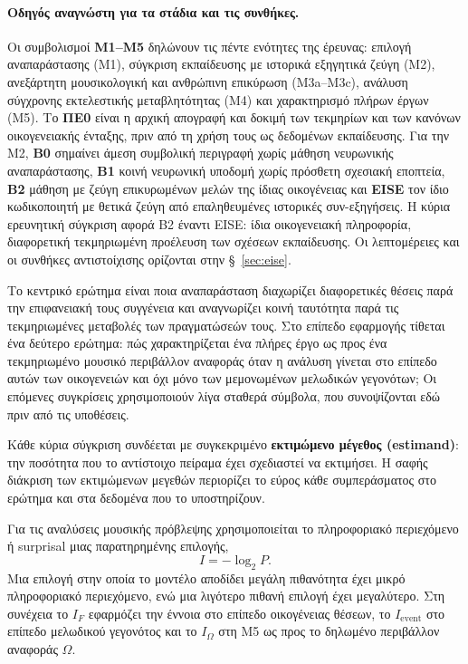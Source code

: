 \documentclass[11pt,a4paper]{article}
\begin{document}
\paragraph{Οδηγός αναγνώστη για τα στάδια και τις συνθήκες.}
Οι συμβολισμοί \textbf{M1--M5} δηλώνουν τις πέντε ενότητες της έρευνας: επιλογή αναπαράστασης (M1), σύγκριση εκπαίδευσης με ιστορικά εξηγητικά ζεύγη (M2), ανεξάρτητη μουσικολογική και ανθρώπινη επικύρωση (M3a--M3c), ανάλυση σύγχρονης εκτελεστικής μεταβλητότητας (M4) και χαρακτηρισμό πλήρων έργων (M5). Το \textbf{ΠΕ0} είναι η αρχική απογραφή και δοκιμή των τεκμηρίων και των κανόνων οικογενειακής ένταξης, πριν από τη χρήση τους ως δεδομένων εκπαίδευσης. Για την M2, \textbf{B0} σημαίνει άμεση συμβολική περιγραφή χωρίς μάθηση νευρωνικής αναπαράστασης, \textbf{B1} κοινή νευρωνική υποδομή χωρίς πρόσθετη σχεσιακή εποπτεία, \textbf{B2} μάθηση με ζεύγη επικυρωμένων μελών της ίδιας οικογένειας και \textbf{EISE} τον ίδιο κωδικοποιητή με θετικά ζεύγη από επαληθευμένες ιστορικές συν-εξηγήσεις. Η κύρια ερευνητική σύγκριση αφορά B2 έναντι EISE: ίδια οικογενειακή πληροφορία, διαφορετική τεκμηριωμένη προέλευση των σχέσεων εκπαίδευσης. Οι λεπτομέρειες και οι συνθήκες αντιστοίχισης ορίζονται στην §~\ref{sec:eise}.


Το κεντρικό ερώτημα είναι ποια αναπαράσταση διαχωρίζει διαφορετικές θέσεις παρά την επιφανειακή τους συγγένεια και αναγνωρίζει κοινή ταυτότητα παρά τις τεκμηριωμένες μεταβολές των πραγματώσεών τους. Στο επίπεδο εφαρμογής τίθεται ένα δεύτερο ερώτημα: πώς χαρακτηρίζεται ένα πλήρες έργο ως προς ένα τεκμηριωμένο μουσικό περιβάλλον αναφοράς όταν η ανάλυση γίνεται στο επίπεδο αυτών των οικογενειών και όχι μόνο των μεμονωμένων μελωδικών γεγονότων; Οι επόμενες συγκρίσεις χρησιμοποιούν λίγα σταθερά σύμβολα, που συνοψίζονται εδώ πριν από τις υποθέσεις.

Κάθε κύρια σύγκριση συνδέεται με συγκεκριμένο \textbf{εκτιμώμενο μέγεθος (estimand)}: την ποσότητα που το αντίστοιχο πείραμα έχει σχεδιαστεί να εκτιμήσει. Η σαφής διάκριση των εκτιμώμενων μεγεθών περιορίζει το εύρος κάθε συμπεράσματος στο ερώτημα και στα δεδομένα που το υποστηρίζουν.

Για τις αναλύσεις μουσικής πρόβλεψης χρησιμοποιείται το πληροφοριακό περιεχόμενο ή surprisal μιας παρατηρημένης επιλογής,
\[
I=-\log_2 P.
\]
Μια επιλογή στην οποία το μοντέλο αποδίδει μεγάλη πιθανότητα έχει μικρό πληροφοριακό περιεχόμενο, ενώ μια λιγότερο πιθανή επιλογή έχει μεγαλύτερο. Στη συνέχεια το $I_F$ εφαρμόζει την έννοια στο επίπεδο οικογένειας θέσεων, το $I_{\mathrm{event}}$ στο επίπεδο μελωδικού γεγονότος και το $I_{\Omega}$ στη M5 ως προς το δηλωμένο περιβάλλον αναφοράς $\Omega$.
\end{document}
